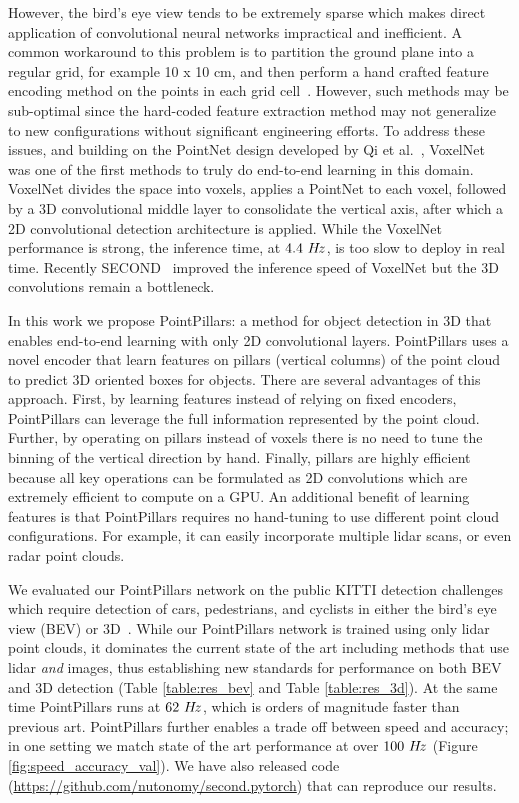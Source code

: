 \documentclass[10pt,twocolumn,letterpaper]{article}
\newcommand{\hertz}{$62~H\hspace{-.5mm}z$\xspace} \newcommand{\maxhertz}{$105~H\hspace{-.5mm}z$\xspace} \newcommand{\decorate}{9\xspace} \newcommand{\maxpillars}{12000\xspace} \newcommand{\maxpts}{100\xspace} \newcommand{\xyres}{0.16\xspace} \newcommand{\lidar}{lidar\xspace}
\newcommand{\figref}[1]{Figure \ref{#1}}
\newcommand{\tableref}[1]{Table \ref{#1}}
\begin{document}
However, the bird's eye view tends to be extremely sparse which makes direct application of convolutional neural networks impractical and inefficient.
A common workaround to this problem is to partition the ground plane into a regular grid,
for example 10 x 10 cm, and then perform a hand crafted feature encoding method on the points in each grid cell~\cite{mv3d, avod, complexyolo, pixor}.
However, such methods may be sub-optimal since the hard-coded feature extraction method may not generalize to new configurations without significant engineering efforts.
To address these issues, and building on the PointNet design developed by Qi et al.~\cite{pointnet}, VoxelNet~\cite{voxelnet} was one of the first methods to truly do end-to-end learning in this domain.
VoxelNet divides the space into voxels, applies a PointNet to each voxel, followed by a 3D convolutional middle layer to consolidate the vertical axis, after which a 2D convolutional detection architecture is applied.
While the VoxelNet performance is strong, the inference time, at $4.4~H\hspace{-.5mm}z$, is too slow to deploy in real time. Recently SECOND~\cite{second} improved the inference speed of VoxelNet but the 3D convolutions remain a bottleneck.

In this work we propose PointPillars: a method for object detection in 3D that enables end-to-end learning with only 2D convolutional layers.
PointPillars uses a novel encoder that learn features on pillars (vertical columns) of the point cloud to predict 3D oriented boxes for objects.
There are several advantages of this approach.
First, by learning features instead of relying on fixed encoders, PointPillars can leverage the full information represented by the point cloud.
Further, by operating on pillars instead of voxels there is no need to tune the binning of the vertical direction by hand.
Finally, pillars are highly efficient because all key operations can be formulated as 2D convolutions which are extremely  efficient to compute on a GPU.
An additional benefit of learning features is that PointPillars requires no hand-tuning to use different point cloud configurations.
For example, it can easily incorporate multiple lidar scans, or even radar point clouds.

We evaluated our PointPillars network on the public KITTI detection challenges which require detection of cars, pedestrians, and cyclists in either the bird's eye view (BEV) or 3D~\cite{kitti}.
While our PointPillars network is trained using only \lidar point clouds, it dominates the current state of the art including methods that use lidar \emph{and} images, thus establishing new standards for performance on both BEV and 3D detection (\tableref{table:res_bev} and \tableref{table:res_3d}). At the same time PointPillars runs at \hertz, which is orders of magnitude faster than previous art. PointPillars further enables a trade off between speed and accuracy; in one setting we match state of the art performance at over $100~H\hspace{-.5mm}z$ (\figref{fig:speed_accuracy_val}). We have also released code (\href{https://github.com/nutonomy/second.pytorch}{https://github.com/nutonomy/second.pytorch}) that can reproduce our results.
\end{document}
